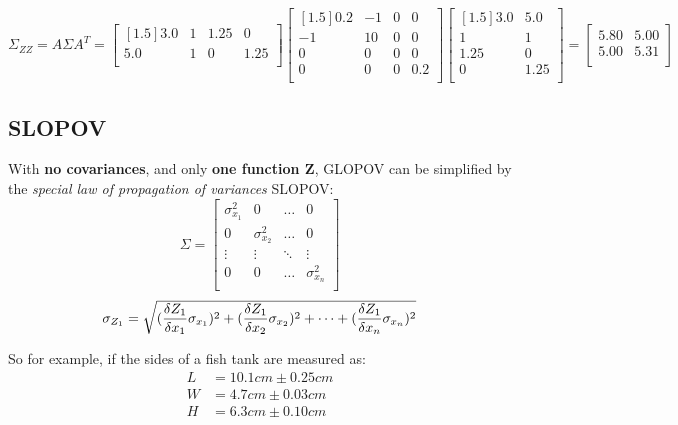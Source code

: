 \[
\Sigma_{ZZ} = A\Sigma A^T = 
\begin{bmatrix}[1.5]
3.0 & 1 & 1.25 & 0 \\
5.0 & 1 & 0 & 1.25 \\
\end{bmatrix}
\begin{bmatrix}[1.5]
0.2 & -1  & 0 & 0\\
-1 & 10  & 0 & 0\\
0 & 0  & 0 & 0 \\
0 & 0  & 0 & 0.2 \\
\end{bmatrix}
\begin{bmatrix}[1.5]
3.0   & 5.0  \\
1   & 1  \\
1.25 & 0 \\
0 & 1.25 \\
\end{bmatrix}
= 
\begin{bmatrix}
5.80&5.00\\
5.00&5.31\\
\end{bmatrix}
\]

\subsection{SLOPOV}
With \textbf{no covariances}, and only \textbf{one function Z}, GLOPOV can be simplified by the \textit{special law of propagation of variances} SLOPOV:
\[
\Sigma = 
\begin{bmatrix}
\sigma^2_{x_{1}} & 0 & \hdots & 0 \\
0 & \sigma^2_{x_{2}} & \hdots & 0 \\
\vdots & \vdots & \ddots & \vdots \\
0 & 0 & \hdots & \sigma^2_{x_{n}} \\
\end{bmatrix}
\]
\[
\sigma_{Z_1} = \sqrt{(\frac{\delta Z_1}{\delta x_1} \sigma_{x_1})^2+(\frac{\delta Z_1}{\delta x_2} \sigma_{x_2})^2+\dots+(\frac{\delta Z_1}{\delta x_n} \sigma_{x_n})^2}
\]

\vspace{0.5cm}
\noindent
So for example, if the sides of a fish tank are measured as:
\begin{align*}
L &= 10.1 cm \pm 0.25cm \\
W &= 4.7 cm  \pm 0.03cm \\
H &= 6.3 cm  \pm 0.10cm \\
\end{align*}

